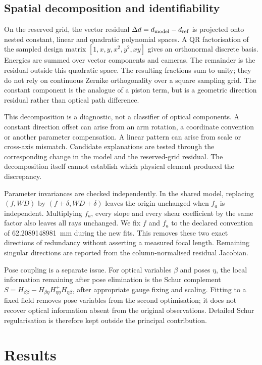 \documentclass[10pt,a4paper]{article}
\begin{document}
\subsection{Spatial decomposition and identifiability}\label{sec:diagnosis}
On the reserved grid, the vector residual $\Delta d=d_{\rm model}-d_{\rm ref}$ is projected onto nested constant, linear and quadratic polynomial spaces. A QR factorisation of the sampled design matrix $[1,x,y,x^2,y^2,xy]$ gives an orthonormal discrete basis. Energies are summed over vector components and cameras. The remainder is the residual outside this quadratic space. The resulting fractions sum to unity; they do not rely on continuous Zernike orthogonality over a square sampling grid. The constant component is the analogue of a piston term, but is a geometric direction residual rather than optical path difference.

This decomposition is a diagnostic, not a classifier of optical components. A constant direction offset can arise from an arm rotation, a coordinate convention or another parameter compensation. A linear pattern can arise from scale or cross-axis mismatch. Candidate explanations are tested through the corresponding change in the model and the reserved-grid residual. The decomposition itself cannot establish which physical element produced the discrepancy.

Parameter invariances are checked independently. In the shared model, replacing $(f,WD)$ by $(f+\delta,WD+\delta)$ leaves the origin unchanged when $f_a$ is independent. Multiplying $f_a$, every slope and every shear coefficient by the same factor also leaves all rays unchanged. We fix $f$ and $f_a$ to the declared convention of 62.2089148981~mm during the new fits. This removes these two exact directions of redundancy without asserting a measured focal length. Remaining singular directions are reported from the column-normalised residual Jacobian.

Pose coupling is a separate issue. For optical variables $\beta$ and poses $\eta$, the local information remaining after pose elimination is the Schur complement $S=H_{\beta\beta}-H_{\beta\eta}H_{\eta\eta}^{+}H_{\eta\beta}$, after appropriate gauge fixing and scaling. Fitting to a fixed field removes pose variables from the second optimisation; it does not recover optical information absent from the original observations. Detailed Schur regularisation is therefore kept outside the principal contribution.

\section{Results}\label{sec:results}
\end{document}
